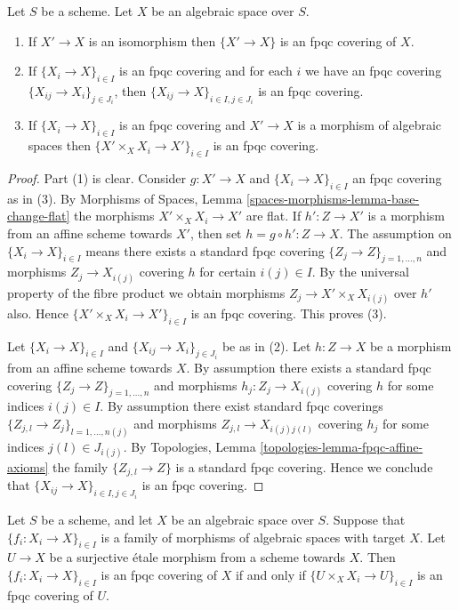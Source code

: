 \begin{lemma}
\label{lemma-fpqc}
Let $S$ be a scheme.
Let $X$ be an algebraic space over $S$.
\begin{enumerate}
\item If $X' \to X$ is an isomorphism then $\{X' \to X\}$
is an fpqc covering of $X$.
\item If $\{X_i \to X\}_{i\in I}$ is an fpqc covering and for each
$i$ we have an fpqc covering $\{X_{ij} \to X_i\}_{j\in J_i}$, then
$\{X_{ij} \to X\}_{i \in I, j\in J_i}$ is an fpqc covering.
\item If $\{X_i \to X\}_{i\in I}$ is an fpqc covering
and $X' \to X$ is a morphism of algebraic spaces then
$\{X' \times_X X_i \to X'\}_{i\in I}$ is an fpqc covering.
\end{enumerate}
\end{lemma}

\begin{proof}
Part (1) is clear. Consider $g : X' \to X$ and
$\{X_i \to X\}_{i\in I}$ an fpqc covering as in (3). By
Morphisms of Spaces, Lemma \ref{spaces-morphisms-lemma-base-change-flat}
the morphisms $X' \times_X X_i \to X'$
are flat. If $h' : Z \to X'$ is a morphism from an affine scheme
towards $X'$, then set $h = g \circ h' : Z \to X$. The assumption
on $\{X_i \to X\}_{i\in I}$ means there exists a standard fpqc covering
$\{Z_j \to Z\}_{j = 1, \ldots, n}$ and morphisms $Z_j \to X_{i(j)}$ covering
$h$ for certain $i(j) \in I$. By the universal property of the fibre product
we obtain morphisms $Z_j \to X' \times_X X_{i(j)}$ over $h'$ also.
Hence $\{X' \times_X X_i \to X'\}_{i\in I}$ is an fpqc covering.
This proves (3).

\medskip\noindent
Let $\{X_i \to X\}_{i\in I}$ and $\{X_{ij} \to X_i\}_{j\in J_i}$ be as
in (2). Let $h : Z \to X$ be a morphism from an affine scheme towards $X$.
By assumption there exists a standard fpqc covering
$\{Z_j \to Z\}_{j = 1, \ldots, n}$ and morphisms $h_j : Z_j \to X_{i(j)}$
covering $h$ for some indices $i(j) \in I$. By assumption there exist
standard fpqc coverings
$\{Z_{j, l} \to Z_j\}_{l = 1, \ldots, n(j)}$
and morphisms $Z_{j, l} \to X_{i(j)j(l)}$ covering
$h_j$ for some indices $j(l) \in J_{i(j)}$. By
Topologies, Lemma \ref{topologies-lemma-fpqc-affine-axioms}
the family $\{Z_{j, l} \to Z\}$ is a standard fpqc covering.
Hence we conclude that $\{X_{ij} \to X\}_{i \in I, j\in J_i}$
is an fpqc covering.
\end{proof}

\begin{lemma}
\label{lemma-recognize-fpqc-covering}
Let $S$ be a scheme, and let $X$ be an algebraic space over $S$.
Suppose that $\{f_i : X_i \to X\}_{i \in I}$ is a family of morphisms of
algebraic spaces with target $X$. Let $U \to X$ be a surjective
\'etale morphism from a scheme towards $X$. Then
$\{f_i : X_i \to X\}_{i \in I}$ is an fpqc covering of $X$ if and only
if $\{U \times_X X_i \to U\}_{i \in I}$ is an fpqc covering of $U$.
\end{lemma}

